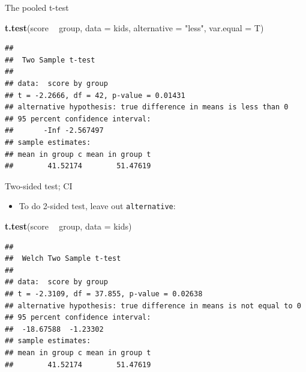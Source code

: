 \documentclass[ignorenonframetext,]{beamer}
\newenvironment{Shaded}{\begin{snugshade}}{\end{snugshade}}
\newcommand{\DataTypeTok}[1]{\textcolor[rgb]{0.13,0.29,0.53}{#1}}
\newcommand{\KeywordTok}[1]{\textcolor[rgb]{0.13,0.29,0.53}{\textbf{#1}}}
\newcommand{\NormalTok}[1]{#1}
\newcommand{\OperatorTok}[1]{\textcolor[rgb]{0.81,0.36,0.00}{\textbf{#1}}}
\newcommand{\StringTok}[1]{\textcolor[rgb]{0.31,0.60,0.02}{#1}}
\providecommand{\tightlist}{%
  \setlength{\itemsep}{0pt}\setlength{\parskip}{0pt}}
\begin{document}
\begin{frame}[fragile]{The pooled t-test}
\protect\hypertarget{the-pooled-t-test}{}

\begin{Shaded}
\begin{Highlighting}[]
\KeywordTok{t.test}\NormalTok{(score }\OperatorTok{~}\StringTok{ }\NormalTok{group, }\DataTypeTok{data =}\NormalTok{ kids, }
       \DataTypeTok{alternative =} \StringTok{"less"}\NormalTok{, }\DataTypeTok{var.equal =}\NormalTok{ T)}
\end{Highlighting}
\end{Shaded}

\begin{verbatim}
## 
##  Two Sample t-test
## 
## data:  score by group
## t = -2.2666, df = 42, p-value = 0.01431
## alternative hypothesis: true difference in means is less than 0
## 95 percent confidence interval:
##       -Inf -2.567497
## sample estimates:
## mean in group c mean in group t 
##        41.52174        51.47619
\end{verbatim}

\end{frame}

\begin{frame}[fragile]{Two-sided test; CI}
\protect\hypertarget{two-sided-test-ci}{}

\begin{itemize}
\tightlist
\item
  To do 2-sided test, leave out \texttt{alternative}:
\end{itemize}

\begin{Shaded}
\begin{Highlighting}[]
\KeywordTok{t.test}\NormalTok{(score }\OperatorTok{~}\StringTok{ }\NormalTok{group, }\DataTypeTok{data =}\NormalTok{ kids)}
\end{Highlighting}
\end{Shaded}

\begin{verbatim}
## 
##  Welch Two Sample t-test
## 
## data:  score by group
## t = -2.3109, df = 37.855, p-value = 0.02638
## alternative hypothesis: true difference in means is not equal to 0
## 95 percent confidence interval:
##  -18.67588  -1.23302
## sample estimates:
## mean in group c mean in group t 
##        41.52174        51.47619
\end{verbatim}

\end{frame}
\end{document}

